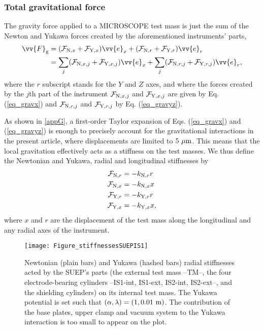 \documentclass[12pt]{iopart}
\begin{document}
\subsubsection{Total gravitational force}

The gravity force applied to a MICROSCOPE test mass is just the sum of the Newton and Yukawa forces created by the aforementioned instruments' parts,
\begin{align}
\vv{F}_{\rm g} &= ({\mathcal F}_{{\rm N},x} + {\mathcal F}_{{\rm Y},x}) \vv{e}_x + ({\mathcal F}_{{\rm N},r} + {\mathcal F}_{{\rm Y},r}) \vv{e}_r\\
&= \sum_j ({\mathcal F}_{{\rm N},x,j} + {\mathcal F}_{{\rm Y},x,j}) \vv{e}_x + \sum_j ({\mathcal F}_{{\rm N},r,j} + {\mathcal F}_{{\rm Y},r,j}) \vv{e}_r,
\end{align}
where the $r$ subscript stands for the $Y$ and $Z$ axes, and where the forces created by the $j$th part of the instrument ${\mathcal F}_{{\rm N},x,j}$ and ${\mathcal F}_{{\rm Y},x,j}$ are given by Eq. (\ref{eq_gravx}) and ${\mathcal F}_{{\rm N},r,j}$ and ${\mathcal F}_{{\rm Y},r,j}$ by Eq. (\ref{eq_gravyz}). 

As shown in  \ref{appG}, a first-order Taylor expansion of Eqs. (\ref{eq_gravx}) and (\ref{eq_gravyz}) is enough to precisely account for the gravitational interactions in the present article, where displacements are limited to $5~\mu{\rm m}$. This means that the local gravitation effectively acts as a stiffness on the test masses. We thus define the Newtonian and Yukawa, radial and longitudinal stiffnesses by
\begin{align}
{\mathcal F}_{{\rm N},r} &= -k_{{\rm N},r} r \\
{\mathcal F}_{{\rm N},x} &= -k_{{\rm N},x} x \\
{\mathcal F}_{{\rm Y},r} &= -k_{{\rm Y},r} r \\
{\mathcal F}_{{\rm Y},x} & = -k_{{\rm Y},x} x,
\end{align}
where $x$ and $r$ are the displacement of the test mass along the longitudinal and any radial axes of the instrument.



\begin{figure}%
\begin{center}
\texttt{[image: Figure\_stiffnessesSUEPIS1]}
\caption{Newtonian (plain bars) and Yukawa (hashed bars) radial stiffnesses acted by the SUEP's parts (the external test mass --TM--, the four electrode-bearing cylinders --IS1-int, IS1-ext, IS2-int, IS2-ext--, and the shielding cylinders) on its internal test mass. The Yukawa potential is set such that $(\alpha, \lambda)=(1, 0.01~{\rm m})$. The contribution of the base plates, upper clamp and vacuum system to the Yukawa interaction is too small to appear on the plot.}
\label{fig_newton}
\end{center}
\end{figure}
\end{document}
